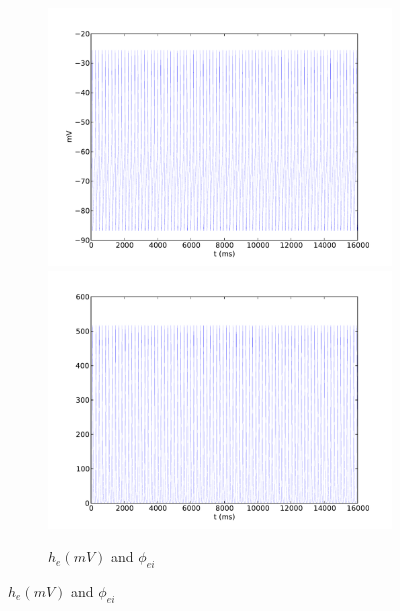 \documentclass[a4paper,12pt]{article}
\begin{document}
\begin{figure}
	\begin{subfigure}[b]{1\textwidth}
		\includegraphics[scale=0.32]{chosen-frontiers-2012/00214-1-0_5-5-0_5-he-phi.pdf}
		\includegraphics[scale=0.32]{chosen-frontiers-2012/00214-1-0_5-5-0_5-phi_ei-phi}
		\caption{$h_e (mV)$ and $\phi_{ei}$}
	\end{subfigure}


\end{figure}
\end{document}
